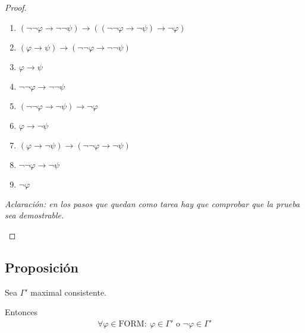 \begin{proof}
\begin{enumerate}
\begin{itemize}
                    \begin{enumerate}
                        \item $(\neg\neg\varphi\to\neg\neg\psi)\to
                            ((\neg\neg\varphi\to\neg\psi)\to\neg\varphi)$
                        \item $(\varphi\to\psi)\to
                            (\neg\neg\varphi\to\neg\neg\psi)$
                        \item $\varphi\to\psi$
                        \item $\neg\neg\varphi \to \neg\neg \psi$
                        \item $(\neg\neg\varphi\to\neg\psi)\to\neg\varphi$
                        \item $\varphi\to\neg\psi$
                        \item $(\varphi\to\neg\psi)\to
                            (\neg\neg\varphi\to\neg\psi)$
                        \item $\neg\neg\varphi\to\neg\psi$
                        \item $\neg\varphi$
                    \end{enumerate}

                    \medskip
                    \textit{Aclaración: en los pasos que quedan como tarea
                        hay que comprobar que la prueba sea demostrable.}
            \end{itemize}
    \end{enumerate}
\end{proof}

\subsection{Proposición}


\begin{proposicion}{}{}
    Sea $\Gamma'$ maximal consistente.

    \medskip

    Entonces 
    \begin{gather*}
        \forall \varphi \in \mathrm{FORM}: ~
        \varphi \in \Gamma' \text{ o } \neg \varphi \in \Gamma'
    \end{gather*}    
\end{proposicion}

